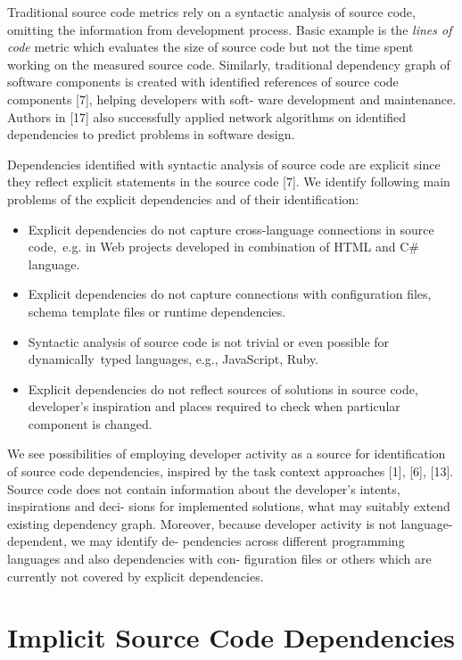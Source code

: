 \documentclass[a4paper]{llncs}
\begin{document}
Traditional source code metrics rely on a syntactic analysis of source code, omitting the information from development process. Basic example is the \textit{lines of code} metric which evaluates the size of source code but not the time spent working on the measured source code. Similarly, traditional dependency graph of software components is created with identified references of source code components [7], helping developers with soft- ware development and maintenance. Authors in [17] also successfully applied network algorithms on identified dependencies to predict problems in software design.

Dependencies identified with syntactic analysis of source code are explicit since they reflect explicit statements in the source code [7]. We identify following main problems of the explicit dependencies and of their identification:

\begin{itemize}
\renewcommand{\labelitemi}{$\bullet$}
\item  
Explicit dependencies do not capture cross-language connections in source code,~e.g. in Web projects developed in combination of HTML and C\# language. 
\item
Explicit dependencies do not capture connections with configuration files, schema template files or runtime dependencies.
\item
Syntactic analysis of source code is not trivial or even possible for dynamically~typed languages, e.g., JavaScript, Ruby. 
\item
Explicit dependencies do not reflect sources of solutions in source code, developer's inspiration and places required to check when particular component is changed.
\end{itemize}

\noindent We see possibilities of employing developer activity as a source for identification of source code dependencies, inspired by the task context approaches [1], [6], [13]. Source code does not contain information about the developer’s intents, inspirations and deci- sions for implemented solutions, what may suitably extend existing dependency graph. Moreover, because developer activity is not language-dependent, we may identify de- pendencies across different programming languages and also dependencies with con- figuration files or others which are currently not covered by explicit dependencies.

\section{Implicit Source Code Dependencies}
\end{document}
